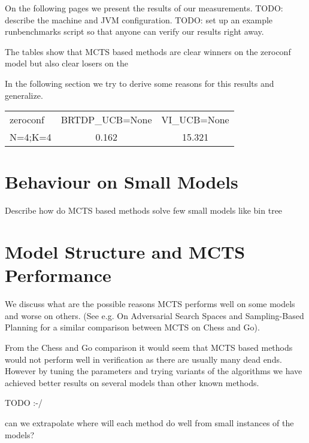 On the following pages we present the results of our measurements. TODO:
describe the machine and JVM configuration. TODO: set up an example
runbenchmarks script so that anyone can verify our results right away.

The tables show that MCTS based methods are clear winners on the
zeroconf model but also clear losers on the

In the following section we try to derive some reasons for this results
and generalize.

\begin{landscape}
\begin{tabular}{ l  | c | c  }
zeroconf   &    BRTDP\_UCB=None    &     VI\_UCB=None      \\
N=4;K=4    &                0.162 &               15.321 \\
\end{tabular}
\end{landscape}

\section{Behaviour on Small Models}

Describe how do MCTS based methods solve few small models like bin tree

\section{Model Structure and MCTS Performance}

We discuss what are the possible reasons MCTS performs well on some
models and worse on others. (See e.g. On Adversarial Search Spaces and
Sampling-Based Planning for a similar comparison between MCTS on Chess
and Go).

From the Chess and Go comparison it would seem that MCTS based methods would
not perform well in verification as there are usually many dead ends.
However by tuning the parameters and trying variants of the algorithms
we have achieved better results on several models than other known methods.

TODO :-/

can we extrapolate where will each method do well from small instances of the models?
